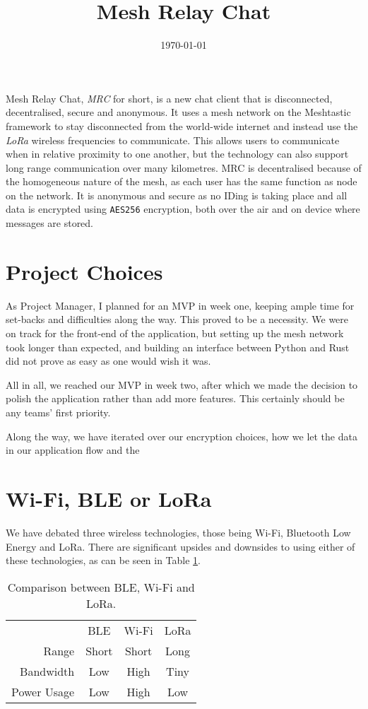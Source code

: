 \documentclass{jatex-article}
\title{Mesh Relay Chat}
\date{\today}
\begin{document}
\justify{}
\maketitle

Mesh Relay Chat, \textit{MRC} for short, is a new chat client that is
disconnected, decentralised, secure and anonymous. It uses a mesh network on
the Meshtastic framework to stay disconnected from the world-wide internet and
instead use the \textit{LoRa} wireless frequencies to communicate. This allows
users to communicate when in relative proximity to one another, but the
technology can also support long range communication over many kilometres. MRC
is decentralised because of the homogeneous nature of the mesh, as each user
has the same function as node on the network. It is anonymous and secure as no
IDing is taking place and all data is encrypted using \texttt{AES256}
encryption, both over the air and on device where messages are stored.

\section*{Project Choices}

As Project Manager, I planned for an MVP in week one, keeping ample time for
set-backs and difficulties along the way. This proved to be a necessity. We
were on track for the front-end of the application, but setting up the mesh
network took longer than expected, and building an interface between Python and
Rust did not prove as easy as one would wish it was.

All in all, we reached our MVP in week two, after which we made the decision to
polish the application rather than add more features. This certainly should be
any teams' first priority.

Along the way, we have iterated over our encryption choices, how we let the
data in our application flow and the

\section*{Wi-Fi, BLE or LoRa}

We have debated three wireless technologies, those being Wi-Fi, Bluetooth Low
Energy and LoRa. There are significant upsides and downsides to using either of
these technologies, as can be seen in Table \ref{wifiblelora}.

\begin{table}[h]
  \centering
  \begin{tabular}{r | c | c | c |}
    \cline{2-4}
                & BLE   & Wi-Fi & LoRa \\ \cline{2-4}
    Range       & Short & Short & Long \\
    Bandwidth   & Low   & High  & Tiny \\
    Power Usage & Low   & High  & Low  \\ \cline{2-4}
  \end{tabular}
  \caption{Comparison between BLE, Wi-Fi and LoRa.}
  \label{wifiblelora}
\end{table}
\end{document}
